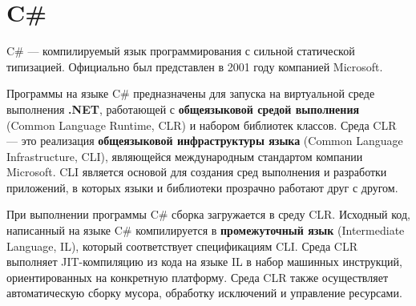 %
%
%
%
%
%
%
%
%
%
%
%
%
%
%





\section{C\#}
C\# \cite{dotnet_tour} --- компилируемый язык программирования с сильной статической типизацией. Официально был представлен в 2001 году компанией Microsoft.

Программы на языке C\# предназначены для запуска на виртуальной среде выполнения \textbf{.NET}, работающей с \textbf{общеязыковой средой выполнения} (Common Language Runtime, CLR) и набором библиотек классов. Среда CLR --- это реализация \textbf{общеязыковой инфраструктуры языка} (Common Language Infrastructure, CLI), являющейся международным стандартом компании Microsoft. CLI является основой для создания сред выполнения и разработки приложений, в которых языки и библиотеки прозрачно работают друг с другом. \cite{dotnet_tour}

При выполнении программы C\# сборка загружается в среду CLR. Исходный код, написанный на языке C\# компилируется в \textbf{промежуточный язык} (Intermediate Language, IL), который соответствует спецификациям CLI. Среда CLR выполняет JIT-компиляцию из кода на языке IL в набор машинных инструкций, ориентированных на конкретную платформу. Среда CLR также осуществляет автоматическую сборку мусора, обработку исключений и управление ресурсами. \cite{dotnet_tour}

